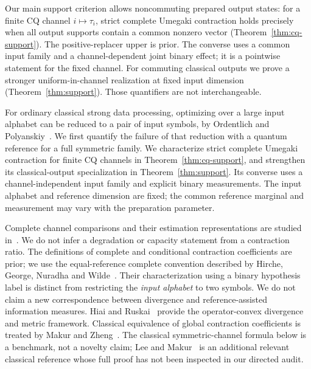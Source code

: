 \documentclass[11pt]{article}
\theoremstyle{remark}\newtheorem{remark}[theorem]{Remark}
\begin{document}
Our main support criterion allows noncommuting prepared output states: for a finite CQ channel $i\mapsto\tau_i$, strict complete Umegaki contraction holds precisely when all output supports contain a common nonzero vector (Theorem~\ref{thm:cq-support}). The positive-replacer upper is prior. The converse uses a common input family and a channel-dependent joint binary effect; it is a pointwise statement for the fixed channel. For commuting classical outputs we prove a stronger uniform-in-channel realization at fixed input dimension (Theorem~\ref{thm:support}). Those quantifiers are not interchangeable.

For ordinary classical strong data processing, optimizing over a large input alphabet can be reduced to a pair of input symbols, by Ordentlich and Polyanskiy~\cite{OP}. We first quantify the failure of that reduction with a quantum reference for a full symmetric family. We characterize strict complete Umegaki contraction for finite CQ channels in Theorem~\ref{thm:cq-support}, and strengthen its classical-output specialization in Theorem~\ref{thm:support}. Its converse uses a channel-independent input family and explicit binary measurements. The input alphabet and reference dimension are fixed; the common reference marginal and measurement may vary with the preparation parameter.

Complete channel comparisons and their estimation representations are studied in~\cite{HircheOrders}. We do not infer a degradation or capacity statement from a contraction ratio. The definitions of complete and conditional contraction coefficients are prior; we use the equal-reference complete convention described by Hirche, George, Nuradha and Wilde~\cite{HGNW}. Their characterization using a binary hypothesis label is distinct from restricting the \emph{input alphabet} to two symbols. We do not claim a new correspondence between divergence and reference-assisted information measures. Hiai and Ruskai~\cite{HR} provide the operator-convex divergence and metric framework. Classical equivalence of global contraction coefficients is treated by Makur and Zheng~\cite{MZ}. The classical symmetric-channel formula below is a benchmark, not a novelty claim; Lee and Makur~\cite{LM} is an additional relevant classical reference whose full proof has not been inspected in our directed audit.
\end{document}
